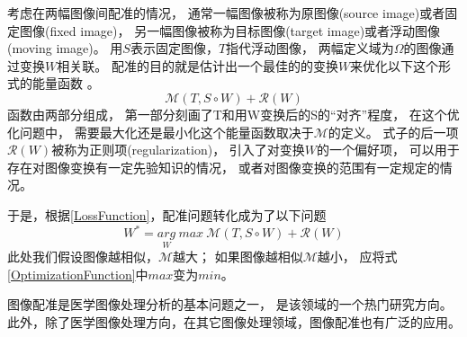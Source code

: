 考虑在两幅图像间配准的情况，
通常一幅图像被称为原图像(source image)或者固定图像(fixed image)，
另一幅图像被称为目标图像(target image)或者浮动图像(moving image)。
用$S$表示固定图像，$T$指代浮动图像，
两幅定义域为$\Omega$的图像通过变换$W$相关联。
配准的目的就是估计出一个最佳的的变换$W$来优化以下这个形式的能量函数
。
\begin{equation}\label{LossFunction}
\mathcal{M}(T,S\circ W)+\mathcal{R}(W)
\end{equation}
函数由两部分组成，
第一部分刻画了T和用W变换后的S的``对齐''程度，
在这个优化问题中，
需要最大化还是最小化这个能量函数取决于$\mathcal{M}$的定义。
式子的后一项$\mathcal{R}(W)$被称为正则项(regularization)，
引入了对变换$W$的一个偏好项，
可以用于存在对图像变换有一定先验知识的情况，
或者对图像变换的范围有一定规定的情况。

于是，根据\ref{LossFunction}，配准问题转化成为了以下问题
\begin{equation}\label{OptimizationFunction}
  W^\ast=\underset{W}{arg} \ max \ \mathcal{M}(T,S\circ W)+\mathcal{R}(W)
\end{equation}
此处我们假设图像越相似，$\mathcal{M}$越大；
如果图像越相似$\mathcal{M}$越小，
应将式\ref{OptimizationFunction}中$max$变为$min$。

图像配准是医学图像处理分析的基本问题之一，
是该领域的一个热门研究方向。
此外，除了医学图像处理方向，在其它图像处理领域，图像配准也有广泛的应用。

